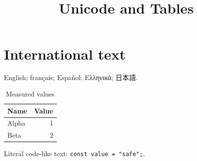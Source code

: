 \documentclass{article}
\title{Unicode and Tables}
\begin{document}
\maketitle
\section{International text}
English; français; Español; Ελληνικά; 日本語.

\begin{table}
\centering
\caption{Measured values}\label{tab:values}
\begin{tabular}{lr}
\toprule
Name & Value \\
\midrule
Alpha & 1 \\
Beta & 2 \\
\bottomrule
\end{tabular}
\end{table}

Literal code-like text: \texttt{const value = "safe";}.
\end{document}
